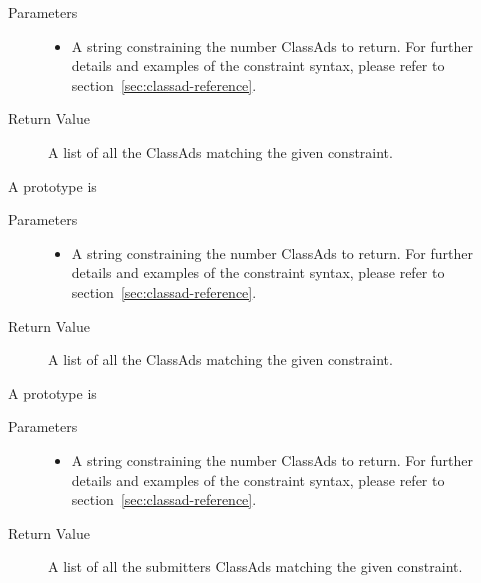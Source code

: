 \begin{description}

  \begin{description}
    \item[ Parameters]
    \begin{itemize}
      \item {} 
      A string constraining the number ClassAds to return. For further details 
      and examples of the constraint syntax, please refer to 
      section~\ref{sec:classad-reference}.
    \end{itemize}
    \item[ Return Value]
      A list of all the  ClassAds matching the given 
      constraint.
  \end{description}   

\item [\Code{queryMasterAds}]
  A prototype is 


  \begin{description}
    \item[ Parameters]
    \begin{itemize}
      \item {} 
      A string constraining the number ClassAds to return. For further details 
      and examples of the constraint syntax, please refer to 
      section~\ref{sec:classad-reference}.
    \end{itemize}
    \item[ Return Value]
      A list of all the  ClassAds matching the given 
      constraint.
  \end{description}

\item [\Code{querySubmittorAds}]
  A prototype is 


  \begin{description}
    \item[ Parameters]
    \begin{itemize}
      \item {} 
      A string constraining the number ClassAds to return. For further details 
      and examples of the constraint syntax, please refer to 
      section~\ref{sec:classad-reference}.
    \end{itemize}
    \item[ Return Value]
      A list of all the submitters ClassAds matching the given 
      constraint.
  \end{description}


\end{description}
